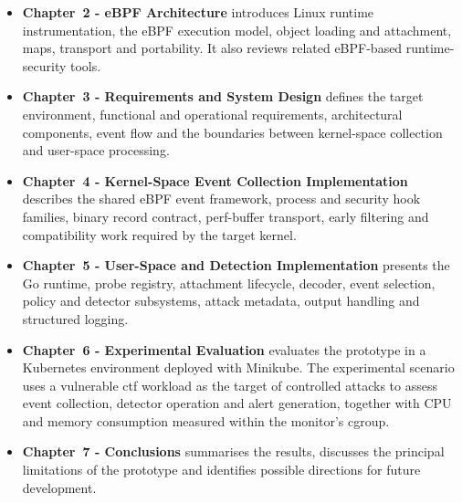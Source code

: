 \begin{itemize}
    \item \textbf{Chapter~2 - eBPF Architecture} introduces Linux runtime instrumentation, the eBPF execution model, object loading and attachment, maps, transport and portability. It also reviews related eBPF-based runtime-security tools.
    \item \textbf{Chapter~3 - Requirements and System Design} defines the target environment, functional and operational requirements, architectural components, event flow and the boundaries between kernel-space collection and user-space processing.
    \item \textbf{Chapter~4 - Kernel-Space Event Collection Implementation} describes the shared eBPF event framework, process and security hook families, binary record contract, perf-buffer transport, early filtering and compatibility work required by the target kernel.
    \item \textbf{Chapter~5 - User-Space and Detection Implementation} presents the Go runtime, probe registry, attachment lifecycle, decoder, event selection, policy and detector subsystems, \gls{attack} metadata, output handling and structured logging.
    \item \textbf{Chapter~6 - Experimental Evaluation} evaluates the prototype in a Kubernetes environment deployed with Minikube. The experimental scenario uses a vulnerable \gls{ctf} workload as the target of controlled attacks to assess event collection, detector operation and alert generation, together with CPU and memory consumption measured within the monitor's cgroup.
    \item \textbf{Chapter~7 - Conclusions} summarises the results, discusses the principal limitations of the prototype and identifies possible directions for future development.
\end{itemize}
